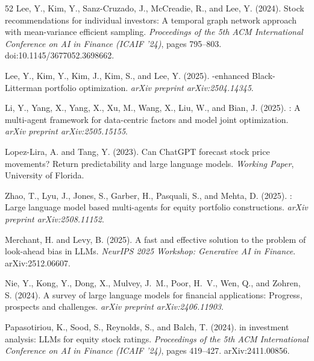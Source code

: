 {\begin{thebibliography}{52}
Lee, Y., Kim, Y., Sanz-Cruzado, J., McCreadie, R., and Lee, Y. (2024).
\newblock Stock recommendations for individual investors: A temporal graph network approach with mean-variance efficient sampling.
\newblock \emph{Proceedings of the 5th ACM International Conference on AI in Finance (ICAIF '24)}, pages 795--803. doi:10.1145/3677052.3698662.

Lee, Y., Kim, Y., Kim, J., Kim, S., and Lee, Y. (2025).
-enhanced {B}lack-{L}itterman portfolio optimization.
\newblock \emph{arXiv preprint arXiv:2504.14345}.

Li, Y., Yang, X., Yang, X., Xu, M., Wang, X., Liu, W., and Bian, J. (2025).
: A multi-agent framework for data-centric factors and model joint optimization.
\newblock \emph{arXiv preprint arXiv:2505.15155}.

Lopez-Lira, A. and Tang, Y. (2023).
\newblock Can {ChatGPT} forecast stock price movements? {R}eturn predictability and large language models.
\newblock \emph{Working Paper}, University of Florida.

Zhao, T., Lyu, J., Jones, S., Garber, H., Pasquali, S., and Mehta, D. (2025).
: Large language model based multi-agents for equity portfolio constructions.
\newblock \emph{arXiv preprint arXiv:2508.11152}.

Merchant, H. and Levy, B. (2025).
\newblock A fast and effective solution to the problem of look-ahead bias in {LLMs}.
\newblock \emph{NeurIPS 2025 Workshop: Generative AI in Finance}. arXiv:2512.06607.

Nie, Y., Kong, Y., Dong, X., Mulvey, J.~M., Poor, H.~V., Wen, Q., and Zohren, S. (2024).
\newblock A survey of large language models for financial applications: Progress, prospects and challenges.
\newblock \emph{arXiv preprint arXiv:2406.11903}.

Papasotiriou, K., Sood, S., Reynolds, S., and Balch, T. (2024).
 in investment analysis: {LLMs} for equity stock ratings.
\newblock \emph{Proceedings of the 5th ACM International Conference on AI in Finance (ICAIF '24)}, pages 419--427. arXiv:2411.00856.


\end{thebibliography}}

